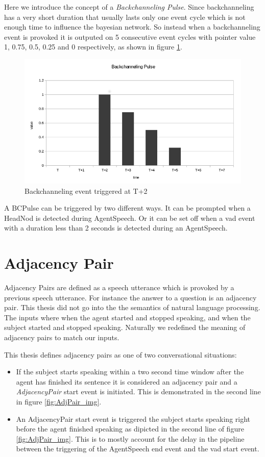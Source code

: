 \documentclass[12pt, a4paper, fleqn]{memoir}%
\begin{document}
Here we introduce the concept of a \textit{Backchanneling Pulse}. Since backchanneling has a very short duration that usually lasts only one event cycle which is not enough time to influence the bayesian network. So instead when a backchanneling event is provoked it is outputed on 5 consecutive event cycles with pointer value 1, 0.75, 0.5, 0.25 and 0 respectively, as shown in figure \ref{fig:bcp_img}.

\begin{figure}[h!]
    \centering
    \includegraphics[width=1\textwidth]{bcp}
    \caption{Backchanneling event triggered at T+2}
    \label{fig:bcp_img}
\end{figure}

A BCPulse can be triggered by two different ways. It can be prompted when a HeadNod is detected during AgentSpeech. Or it can be set off when a vad event with a duration less than 2 seconds is detected during an AgentSpeech.

\section{Adjacency Pair}
\label{sec:AdjacencyPair}
Adjacency Pairs are defined as a speech utterance which is provoked by a previous speech utterance. For instance the answer to a question is an adjacency pair. This thesis did not go into the the semantics of natural language processing. The inputs where when the agent started and stopped speaking, and when the subject started and stopped speaking. Naturally we redefined the meaning of adjacency pairs to match our inputs.

This thesis defines adjacency pairs as one of two conversational situations:

\begin{itemize}
  \item If the subject starts speaking within a two second time window after the agent has finished its sentence it is considered an adjacency pair and a \textit{AdjacencyPair} start event is initiated. This is demonstrated in the second line in figure \ref{fig:AdjPair_img}.
  \item An AdjacencyPair start event is triggered the subject starts speaking right before the agent finished speaking as dipicted in the second line of figure \ref{fig:AdjPair_img}. This is to mostly account for the delay in the pipeline between the triggering of the AgentSpeech end event and the vad start event.
\end{itemize}
\end{document}
